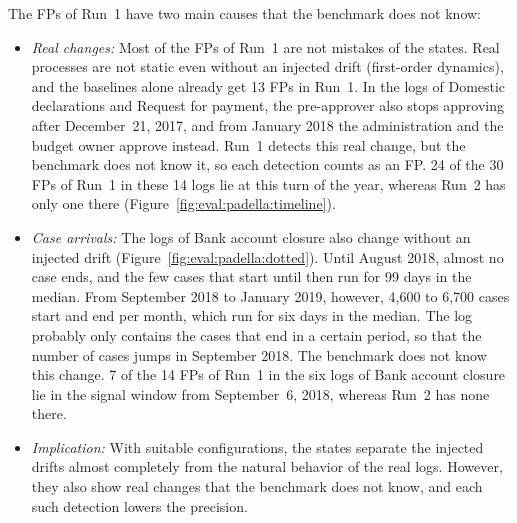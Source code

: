 The FPs of Run~1 have two main causes that the benchmark does not know:
\begin{itemize}
	\item \emph{Real changes:} Most of the FPs of Run~1 are not mistakes of the states. Real processes are not static even without an injected drift (first-order dynamics), and the baselines alone already get 13 FPs in Run~1. In the logs of Domestic declarations and Request for payment, the pre-approver also stops approving after December~21, 2017, and from January 2018 the administration and the budget owner approve instead. Run~1 detects this real change, but the benchmark does not know it, so each detection counts as an FP. 24 of the 30 FPs of Run~1 in these 14 logs lie at this turn of the year, whereas Run~2 has only one there (Figure~\ref{fig:eval:padella:timeline}).
	\item \emph{Case arrivals:} The logs of Bank account closure also change without an injected drift (Figure~\ref{fig:eval:padella:dotted}). Until August 2018, almost no case ends, and the few cases that start until then run for 99 days in the median. From September 2018 to January 2019, however, 4,600 to 6,700 cases start and end per month, which run for six days in the median. The log probably only contains the cases that end in a certain period, so that the number of cases jumps in September 2018. The benchmark does not know this change. 7 of the 14 FPs of Run~1 in the six logs of Bank account closure lie in the signal window from September~6, 2018, whereas Run~2 has none there.
	\item \emph{Implication:} With suitable configurations, the states separate the injected drifts almost completely from the natural behavior of the real logs. However, they also show real changes that the benchmark does not know, and each such detection lowers the precision.
\end{itemize}

